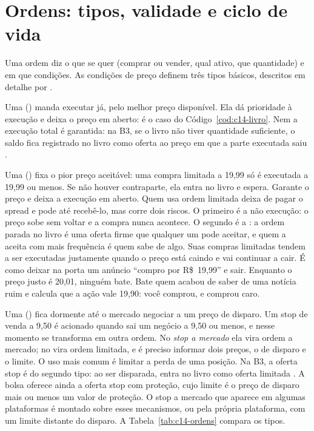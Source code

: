 \section{Ordens: tipos, validade e ciclo de vida}

Uma ordem diz o que se quer (comprar ou vender, qual ativo, que quantidade) e em que condições. As condições de preço definem três tipos básicos, descritos em detalhe por \citet{harris2003}.

Uma  () manda executar já, pelo melhor preço disponível. Ela dá prioridade à execução e deixa o preço em aberto: é o caso do Código~\ref{cod:c14-livro}. Nem a execução total é garantida: na B3, se o livro não tiver quantidade suficiente, o saldo fica registrado no livro como oferta ao preço em que a parte executada saiu \citep{b3mpo}.

Uma  () fixa o pior preço aceitável: uma compra limitada a 19,99 só é executada a 19,99 ou menos. Se não houver contraparte, ela entra no livro e espera. Garante o preço e deixa a execução em aberto. Quem usa ordem limitada deixa de pagar o spread e pode até recebê-lo, mas corre dois riscos. O primeiro é a não execução: o preço sobe sem voltar e a compra nunca acontece. O segundo é a : a ordem parada no livro é uma oferta firme que qualquer um pode aceitar, e quem a aceita com mais frequência é quem sabe de algo. Suas compras limitadas tendem a ser executadas justamente quando o preço está caindo e vai continuar a cair. É como deixar na porta um anúncio ``compro por R\$~19,99'' e sair. Enquanto o preço justo é 20,01, ninguém bate. Bate quem acabou de saber de uma notícia ruim e calcula que a ação vale 19,90: você comprou, e comprou caro.

Uma  () fica dormente até o mercado negociar a um preço de disparo. Um stop de venda a 9,50 é acionado quando sai um negócio a 9,50 ou menos, e nesse momento se transforma em outra ordem. No \emph{stop a mercado} ela vira ordem a mercado; no  vira ordem limitada, e é preciso informar dois preços, o de disparo e o limite. O uso mais comum é limitar a perda de uma posição. Na B3, a oferta stop é do segundo tipo: ao ser disparada, entra no livro como oferta limitada \citep{b3ofertas}. A bolsa oferece ainda a oferta stop com proteção, cujo limite é o preço de disparo mais ou menos um valor de proteção. O stop a mercado que aparece em algumas plataformas é montado sobre esses mecanismos, ou pela própria plataforma, com um limite distante do disparo. A Tabela~\ref{tab:c14-ordens} compara os tipos.

